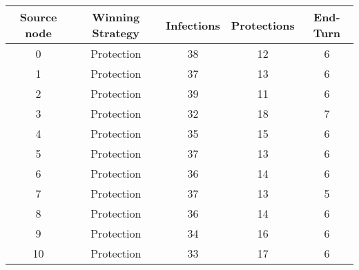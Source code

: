 \documentclass[results.tex]{subfiles}
\begin{document}
    \begin{center}
        \begin{tabular}{| c || c | c | c | c |}
            \hline
            {\bfseries Source node} & {\bfseries Winning Strategy} & {\bfseries Infections} & {\bfseries Protections}
            & {\bfseries End-Turn}
            \\  %
            \hline\hline
            0                       & Protection                   & 38                     & 12                      & 6                    \\
            \hline
            1                       & Protection                   & 37                     & 13                      & 6                    \\
            \hline
            2                       & Protection                   & 39                     & 11                      & 6                    \\
            \hline
            3                       & Protection                   & 32                     & 18                      & 7                    \\
            \hline
            4                       & Protection                   & 35                     & 15                      & 6                    \\
            \hline
            5                       & Protection                   & 37                     & 13                      & 6                    \\
            \hline
            6                       & Protection                   & 36                     & 14                      & 6                    \\
            \hline
            7                       & Protection                   & 37                     & 13                      & 5                    \\
            \hline
            8                       & Protection                   & 36                     & 14                      & 6                    \\
            \hline
            9                       & Protection                   & 34                     & 16                      & 6                    \\
            \hline
            10                      & Protection                   & 33                     & 17                      & 6                    \\

\end{tabular}
\end{center}
\end{document}
